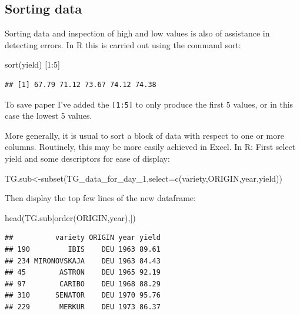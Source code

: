 \documentclass[
]{book}
\newenvironment{Shaded}{\begin{snugshade}}{\end{snugshade}}
\newcommand{\AttributeTok}[1]{\textcolor[rgb]{0.77,0.63,0.00}{#1}}
\newcommand{\DecValTok}[1]{\textcolor[rgb]{0.00,0.00,0.81}{#1}}
\newcommand{\FunctionTok}[1]{\textcolor[rgb]{0.00,0.00,0.00}{#1}}
\newcommand{\NormalTok}[1]{#1}
\newcommand{\OtherTok}[1]{\textcolor[rgb]{0.56,0.35,0.01}{#1}}
\newcommand{\SpecialCharTok}[1]{\textcolor[rgb]{0.00,0.00,0.00}{#1}}
\begin{document}
\hypertarget{sorting-data}{%
\subsection{Sorting data}\label{sorting-data}}

Sorting data and inspection of high and low values is also of assistance in detecting errors. In R this is carried out using the command sort:

\begin{Shaded}
\begin{Highlighting}[]
\FunctionTok{sort}\NormalTok{(yield) [}\DecValTok{1}\SpecialCharTok{:}\DecValTok{5}\NormalTok{]}
\end{Highlighting}
\end{Shaded}

\begin{verbatim}
## [1] 67.79 71.12 73.67 74.12 74.38
\end{verbatim}

To save paper I've added the \texttt{{[}1:5{]}} to only produce the first 5 values, or in this case the lowest 5 values.

More generally, it is usual to sort a block of data with respect to one or more columns. Routinely, this may be more easily achieved in Excel. In R: First select yield and some descriptors for ease of display:

\begin{Shaded}
\begin{Highlighting}[]
\NormalTok{TG.sub}\OtherTok{\textless{}{-}}\FunctionTok{subset}\NormalTok{(TG\_data\_for\_day\_1,}\AttributeTok{select=}\FunctionTok{c}\NormalTok{(variety,ORIGIN,year,yield))}
\end{Highlighting}
\end{Shaded}

Then display the top few lines of the new dataframe:

\begin{Shaded}
\begin{Highlighting}[]
\FunctionTok{head}\NormalTok{(TG.sub[}\FunctionTok{order}\NormalTok{(ORIGIN,year),])}
\end{Highlighting}
\end{Shaded}

\begin{verbatim}
##          variety ORIGIN year yield
## 190         IBIS    DEU 1963 89.61
## 234 MIRONOVSKAJA    DEU 1963 84.43
## 45        ASTRON    DEU 1965 92.19
## 97        CARIBO    DEU 1968 88.29
## 310      SENATOR    DEU 1970 95.76
## 229       MERKUR    DEU 1973 86.37
\end{verbatim}
\end{document}

